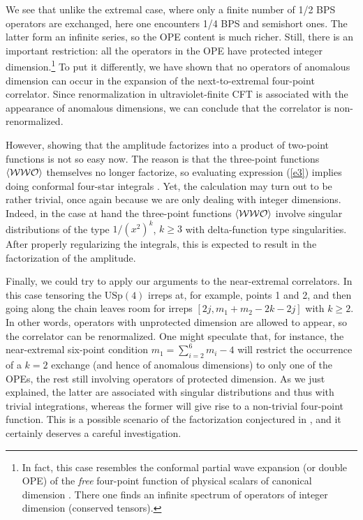 \documentclass[a4paper,11pt]{article}
\begin{document}
We see that unlike the extremal case, where only a finite number of 1/2 BPS
operators are exchanged, here one encounters 1/4 BPS and semishort ones. The
latter form an infinite series, so the OPE content is much richer. Still, there
is an important restriction: all the operators in the OPE have protected
integer dimension.\footnote{In fact, this case resembles the conformal partial
wave expansion (or double OPE) of the {\it free} four-point function of
physical scalars of canonical dimension \cite{Pisa}. There one finds an
infinite spectrum of operators of integer dimension (conserved tensors).} To
put it differently, we have shown that no operators of anomalous dimension can
occur in the expansion of the next-to-extremal four-point correlator. Since
renormalization in ultraviolet-finite CFT is associated with the appearance of
anomalous dimensions, we can conclude that the correlator is non-renormalized.

However, showing that the amplitude factorizes into a product of two-point
functions is not so easy now. The reason is that the three-point functions
$\langle {\cal W} {\cal W} {\cal O} \rangle$ themselves no longer factorize,
so evaluating expression (\ref{e3}) implies doing conformal
four-star integrals \cite{Symanzik}. Yet, the calculation may turn out to be
rather trivial, once again because we are only dealing with integer dimensions.
Indeed, in the case at hand the three-point functions $\langle {\cal W} {\cal
W} {\cal O} \rangle$ involve singular distributions of the type $1/(x^2)^k$,
$k\geq3$ with delta-function type singularities. After properly regularizing
the integrals, this is expected to result in the factorization of the
amplitude.

Finally, we could try to apply our arguments to the near-extremal correlators.
In this case tensoring the $\mbox{USp}(4)$ irreps at, for example,
points 1 and 2, and
then going along the chain leaves room for irreps $[2j,m_1+m_2-2k-2j]$ with
$k\geq 2$. In other words, operators with unprotected dimension are allowed to
appear, so the correlator can be renormalized. One might speculate that, for
instance, the near-extremal six-point condition $m_1 =\sum_{i=2}^6 m_i - 4$
will restrict the occurrence of a $k=2$ exchange (and hence of anomalous
dimensions) to only one of the OPEs, the rest still involving operators of
protected dimension. As we just explained, the latter are associated with
singular distributions and thus with trivial integrations, whereas the former
will give rise to a non-trivial four-point function. This is a possible
scenario of the factorization conjectured in \cite{D'Hoker:2000dm,DP}, and it
certainly deserves a careful investigation.
\end{document}
